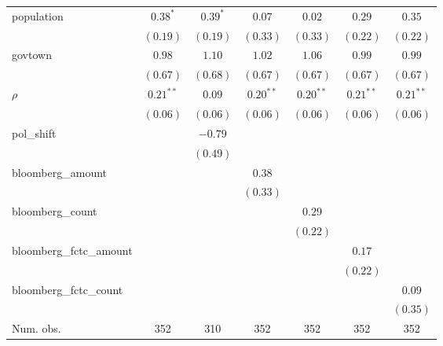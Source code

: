 \begin{table}[!h]
\begin{center}
\begin{tabular}{l c c c c c c }
population              & $0.38^{*}$   & $0.39^{*}$   & $0.07$       & $0.02$       & $0.29$       & $0.35$       \\
                        & $(0.19)$     & $(0.19)$     & $(0.33)$     & $(0.33)$     & $(0.22)$     & $(0.22)$     \\
govtown                 & $0.98$       & $1.10$       & $1.02$       & $1.06$       & $0.99$       & $0.99$       \\
                        & $(0.67)$     & $(0.68)$     & $(0.67)$     & $(0.67)$     & $(0.67)$     & $(0.67)$     \\
$\rho$                  & $0.21^{**}$  & $0.09$       & $0.20^{**}$  & $0.20^{**}$  & $0.21^{**}$  & $0.21^{**}$  \\
                        & $(0.06)$     & $(0.06)$     & $(0.06)$     & $(0.06)$     & $(0.06)$     & $(0.06)$     \\
pol\_shift              &              & $-0.79$      &              &              &              &              \\
                        &              & $(0.49)$     &              &              &              &              \\
bloomberg\_amount       &              &              & $0.38$       &              &              &              \\
                        &              &              & $(0.33)$     &              &              &              \\
bloomberg\_count        &              &              &              & $0.29$       &              &              \\
                        &              &              &              & $(0.22)$     &              &              \\
bloomberg\_fctc\_amount &              &              &              &              & $0.17$       &              \\
                        &              &              &              &              & $(0.22)$     &              \\
bloomberg\_fctc\_count  &              &              &              &              &              & $0.09$       \\
                        &              &              &              &              &              & $(0.35)$     \\
\midrule
Num. obs.               & 352          & 310          & 352          & 352          & 352          & 352          \\

\end{tabular}
\end{center}
\end{table}
